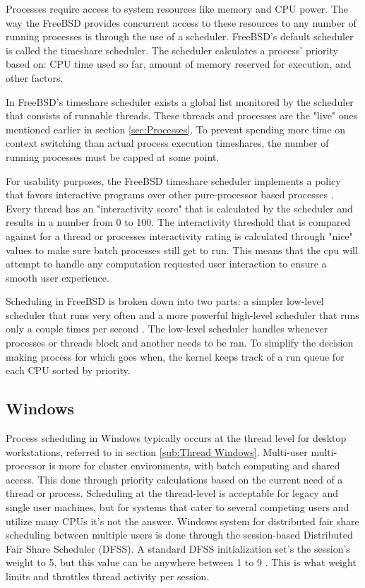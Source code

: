 \documentclass[10pt,draftclsnofoot,onecolumn]{IEEEtran}
\begin{document}
\par Processes require access to system resources like memory and CPU power.
The way the FreeBSD provides concurrent access to these resources to any number of running processes is through the use of a scheduler.
FreeBSD's default scheduler is called the timeshare scheduler.
The scheduler calculates a process' priority based on: CPU time used so far, amount of memory reserved for execution, and other factors.
\par In FreeBSD's timeshare scheduler exists a global list monitored by the scheduler that consists of runnable threads.
These threads and processes are the "live" ones mentioned earlier in section \ref{sec:Processes}.
To prevent spending more time on context switching than actual process execution timeshares, the number of running processes must be capped at some point.
\par For usability purposes, the FreeBSD timeshare scheduler implements a policy that favors interactive programs over other pure-processor based processes \cite{bsd:1}.
Every thread has an "interactivity score" that is calculated by the scheduler and results in a number from 0 to 100.
The interactivity threshold that is compared against for a thread or processes interactivity rating is calculated through "nice" values to make sure batch processes still get to run.
This means that the cpu will attempt to handle any computation requested user interaction to ensure a smooth user experience.
\par Scheduling in FreeBSD is broken down into two parts: a simpler low-level scheduler that runs very often and a more powerful high-level scheduler that runs only a couple times per second \cite{bsd:1}.
The low-level scheduler handles whenever processes or threads block and another needs to be ran.
To simplify the decision making process for which goes when, the kernel keeps track of a run queue for each CPU sorted by priority.

\subsection{Windows}
\label{sub:CPU Scheduling Windows}

\par Process scheduling in Windows typically occurs at the thread level for desktop workstations, referred to in section \ref{sub:Thread Windows}.
Multi-user multi-processor is more for cluster environments, with batch computing and shared access.
This done through priority calculations based on the current need of a thread or process.
Scheduling at the thread-level is acceptable for legacy and single user machines, but for systems that cater to several competing users and utilize many CPUs it's not the answer.
Windows system for distributed fair share scheduling between multiple users is done through the session-based Distributed Fair Share Scheduler (DFSS).
A standard DFSS initialization set's the session's weight to 5, but this value can be anywhere between 1 to 9 \cite{win:1}.
This is what weight limits and throttles thread activity per session.
\end{document}
